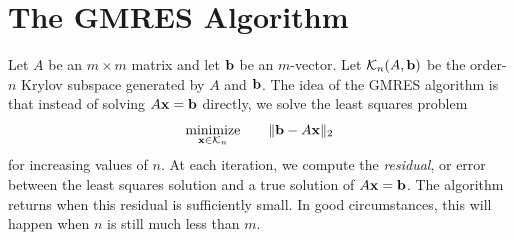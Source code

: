 \section*{The GMRES Algorithm}
Let $A$ be an $m \times m$ matrix and let ${\bf b}$ be an $m$-vector.
Let $\mathcal{K}_n(A, {\bf b})$ be the order-$n$ Krylov subspace generated by $A$ and ${\bf b}$.
The idea of the GMRES algorithm is that instead of solving $A{\bf x} = {\bf b}$ directly, we solve the least squares problem
\begin{equation}
\underset{{\bf x} \in \mathcal{K}_n}{\text{minimize}}\qquad \|{\bf b}-A{\bf x}\|_2
\label{eq:GMRES_lstsq1}
\end{equation}
for increasing values of $n$.
At each iteration, we compute the \emph{residual}, or error between the least squares solution and a true solution of $A{\bf x} = {\bf b}$.
The algorithm returns when this residual is sufficiently small.
In good circumstances, this will happen when $n$ is still much less than $m$.

